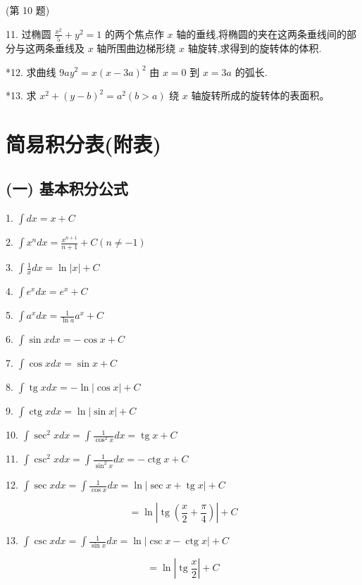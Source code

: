 \documentclass[lang=cn,newtx,10pt,scheme=chinese]{elegantbook}
\begin{document}
(第 10 题)

11. 过椭圆 \(\frac{{x}^{2}}{5} + {y}^{2} = 1\) 的两个焦点作 \(x\) 轴的垂线,将椭圆的夹在这两条垂线间的部分与这两条垂线及 \(x\) 轴所围曲边梯形绕 \(x\) 轴旋转,求得到的旋转体的体积.

*12. 求曲线 \({9a}{y}^{2} = x{\left( x - 3a\right) }^{2}\) 由 \(x = 0\) 到 \(x = {3a}\) 的弧长.

*13. 求 \({x}^{2} + {\left( y - b\right) }^{2} = {a}^{2}\left( {b > a}\right)\) 绕 \(x\) 轴旋转所成的旋转体的表面积。

\chapter{简易积分表(附表)}

\section*{(一) 基本积分公式}

1. \(\int {dx} = x + C\)

2. \(\int {x}^{n}{dx} = \frac{{x}^{n + 1}}{n + 1} + C\left( {n \neq - 1}\right)\)

3. \(\int \frac{1}{x}{dx} = \ln \left| x\right| + C\)

4. \(\int {e}^{x}{dx} = {e}^{x} + C\)

5. \(\int {a}^{x}{dx} = \frac{1}{\ln a}{a}^{x} + C\)

6. \(\int \sin {xdx} = - \cos x + C\)

7. \(\int \cos {xdx} = \sin x + C\)

8. \(\int \operatorname{tg}{xdx} = - \ln \left| {\cos x}\right| + C\)

9. \(\int \operatorname{ctg}{xdx} = \ln \left| {\sin x}\right| + C\)

10. \(\int {\sec }^{2}{xdx} = \int \frac{1}{{\cos }^{2}x}{dx} = \operatorname{tg}x + C\)

11. \(\int {\csc }^{2}{xdx} = \int \frac{1}{{\sin }^{2}x}{dx} = - \operatorname{ctg}x + C\)

12. \(\int \sec {xdx} = \int \frac{1}{\cos x}{dx} = \ln \left| {\sec x + \operatorname{tg}x}\right| + C\)

\[
= \ln \left| {\operatorname{tg}\left( {\frac{x}{2} + \frac{\pi }{4}}\right) }\right| + C
\]

13. \(\int \csc {xdx} = \int \frac{1}{\sin x}{dx} = \ln \left| {\csc x - \operatorname{ctg}x}\right| + C\)

\[
= \ln \left| {\operatorname{tg}\frac{x}{2}}\right| + C
\]
\end{document}

